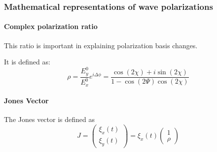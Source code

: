 

\subsubsection{Mathematical representations of wave polarizations}

\paragraph{ Complex polarization ratio }
This ratio is important in explaining polarization basis changes.

It is defined as:
\begin{equation}
\rho = \frac{E_y^0}{E_x^0} e^{i \Delta \phi} = \frac{\cos(2 \chi) + i \sin(2 \chi)}{1 - \cos(2\Psi) \cos(2\chi)}
\end{equation}

\paragraph{Jones Vector}


The Jones vector is defined as 
\begin{equation}
J = 
\left(
\begin{array}{c}
	\xi_x(t) \\
	\xi_y(t) 
\end{array}
\right)
= \xi_x(t)
\left(
\begin{array}{c}
	1 \\
	\rho
\end{array}
\right)
\end{equation}

